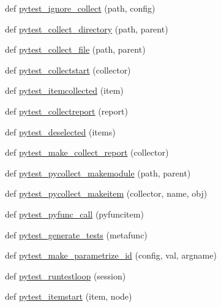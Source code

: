 \begin{DoxyCompactItemize}
\item 
def \hyperlink{namespace__pytest_1_1hookspec_a358c7b44a8494a6a09b517d91bc48d83}{pytest\+\_\+ignore\+\_\+collect} (path, config)
\item 
def \hyperlink{namespace__pytest_1_1hookspec_a1f9b6e29568c9ad5d395a2bda355d380}{pytest\+\_\+collect\+\_\+directory} (path, parent)
\item 
def \hyperlink{namespace__pytest_1_1hookspec_adf22f3911f1607ac2e211b5c39dd4c27}{pytest\+\_\+collect\+\_\+file} (path, parent)
\item 
def \hyperlink{namespace__pytest_1_1hookspec_a12d78e4930cbe75b1f10a8d666097531}{pytest\+\_\+collectstart} (collector)
\item 
def \hyperlink{namespace__pytest_1_1hookspec_ac7dae502fe8690c2398c77d95f3ba50e}{pytest\+\_\+itemcollected} (item)
\item 
def \hyperlink{namespace__pytest_1_1hookspec_ab461cccb10d98c6e51b79ced9306e764}{pytest\+\_\+collectreport} (report)
\item 
def \hyperlink{namespace__pytest_1_1hookspec_a8f2b7b3881318461bd26ea869b4333a9}{pytest\+\_\+deselected} (items)
\item 
def \hyperlink{namespace__pytest_1_1hookspec_aea73d01c864d52658935cde8e36bb423}{pytest\+\_\+make\+\_\+collect\+\_\+report} (collector)
\item 
def \hyperlink{namespace__pytest_1_1hookspec_ae09fc8e9baa39a0989b848b74fdb85c1}{pytest\+\_\+pycollect\+\_\+makemodule} (path, parent)
\item 
def \hyperlink{namespace__pytest_1_1hookspec_aa31c1e08b97093e5520b409d1b496065}{pytest\+\_\+pycollect\+\_\+makeitem} (collector, name, obj)
\item 
def \hyperlink{namespace__pytest_1_1hookspec_a660e06eb19db5285eaa93824265e5c53}{pytest\+\_\+pyfunc\+\_\+call} (pyfuncitem)
\item 
def \hyperlink{namespace__pytest_1_1hookspec_af59c92592305cc7f808232b6c852b4c1}{pytest\+\_\+generate\+\_\+tests} (metafunc)
\item 
def \hyperlink{namespace__pytest_1_1hookspec_a3ee04cfa542ef8a2d5070c585827209c}{pytest\+\_\+make\+\_\+parametrize\+\_\+id} (config, val, argname)
\item 
def \hyperlink{namespace__pytest_1_1hookspec_a4beffcba4a93819662741f442b2e1484}{pytest\+\_\+runtestloop} (session)
\item 
def \hyperlink{namespace__pytest_1_1hookspec_aca8f78dbd68f190094841a8e8ca6e276}{pytest\+\_\+itemstart} (item, node)
\item 

\end{DoxyCompactItemize}
